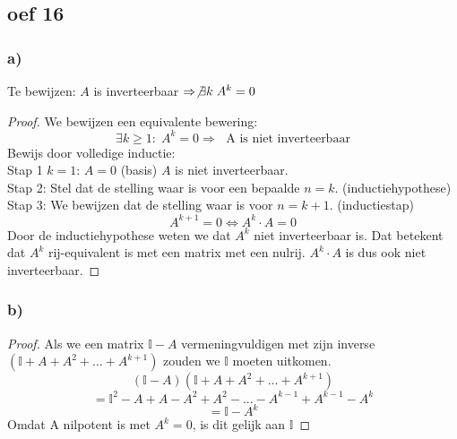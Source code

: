 \documentclass[10pt,a4paper]{article}
\begin{document}
\subsection*{oef 16}
\subsubsection*{a)}
Te bewijzen: $A$ is inverteerbaar $\Rightarrow \not \exists k\; A^k=0$ 
\begin{proof}
We bewijzen een equivalente bewering:
\[
\exists k\ge 1:\;A^k=0 \Rightarrow\; \text{ A is niet inverteerbaar}
\]
Bewijs door volledige inductie:\\
Stap 1 $k=1$: $A=0$ (basis)
$A$ is niet inverteerbaar.\\
Stap 2: Stel dat de stelling waar is voor een bepaalde $n=k$. (inductiehypothese)\\
Stap 3: We bewijzen dat de stelling waar is voor $n=k+1$. (inductiestap)\\
\[ A^{k+1}=0 \Leftrightarrow A^{k}\cdot A=0 \]
Door de inductiehypothese weten we dat $A^{k}$ niet inverteerbaar is. Dat betekent dat $A^{k}$ rij-equivalent is met een matrix met een nulrij. $A^{k} \cdot A$ is dus ook niet inverteerbaar.
\end{proof}

\subsubsection*{b)}
\begin{proof}
Als we een matrix $\mathbb{I}-A$ vermeningvuldigen met zijn inverse $(\mathbb{I}+A+A^2+...+A^{k+1})$ zouden we $\mathbb{I}$ moeten uitkomen.
\[ (\mathbb{I}-A)(\mathbb{I}+A+A^2+...+A^{k+1}) \]
\[ = \mathbb{I}^{2} -A+A-A^{2}+A^{2}-...-A^{k-1}+A^{k-1}-A^{k}\]
\[ = \mathbb{I}-A^{k}\]
Omdat A nilpotent is met $A^k=0$, is dit gelijk aan $\mathbb{I}$
\end{proof}
\end{document}
